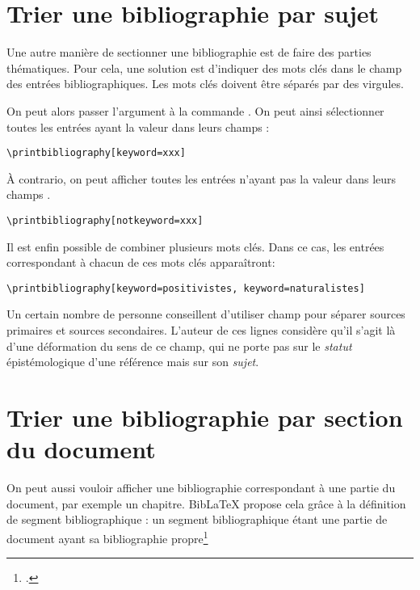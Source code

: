 \section{Trier une bibliographie par sujet}

Une autre manière de  sectionner une bibliographie est de faire des parties thématiques. Pour cela, une solution est d'indiquer des mots clés dans le champ  des entrées bibliographiques. Les mots clés doivent être séparés par des virgules.

On peut alors passer l'argument  à la commande . On peut ainsi sélectionner toutes les entrées ayant la valeur  dans leurs champs  :

\begin{verbatim}
\printbibliography[keyword=xxx]
\end{verbatim}

À contrario, on peut afficher toutes les entrées n'ayant pas la valeur  dans leurs champs .

\begin{verbatim}
\printbibliography[notkeyword=xxx]
\end{verbatim}

Il est enfin possible de combiner plusieurs mots clés. Dans ce cas, les entrées correspondant à chacun de ces mots clés apparaîtront:

\begin{verbatim}
\printbibliography[keyword=positivistes, keyword=naturalistes]
\end{verbatim}

\begin{anedocte}
	Un certain nombre de personne conseillent d'utiliser champ pour séparer sources primaires et sources secondaires. L'auteur de ces lignes considère qu'il s'agit là d'une déformation du sens de ce champ, qui ne porte pas sur le \emph{statut} épistémologique d'une référence mais sur son \emph{sujet}. 
\end{anedocte}

\section{Trier une bibliographie par section du document}

On peut aussi vouloir afficher une bibliographie correspondant à une partie du document, par exemple un chapitre. BibLaTeX propose cela grâce à la définition de segment bibliographique : un segment bibliographique étant une partie de document ayant sa bibliographie propre\footcites[En réalité  propose deux choses différentes : \enquote{segment} et \enquote{section} bibliographique. Seules les sections bibliographiques ont \enquote{réellement} une bibliographie propre, dans la mesure où, si on utilise un style \enquote{numeroté} de bibliographie, la numérotation recommence à chaque changement de section, mais pas à chaque changement de segment. Toutefois il est rare en science humaine d'utiliser un style bibliographique numéroté. C'est pourquoi nous ne parlons ici que des segments bibliographiques et non pas des sections bibliographiques.][]{biblatex_section}{biblatex_segment}

